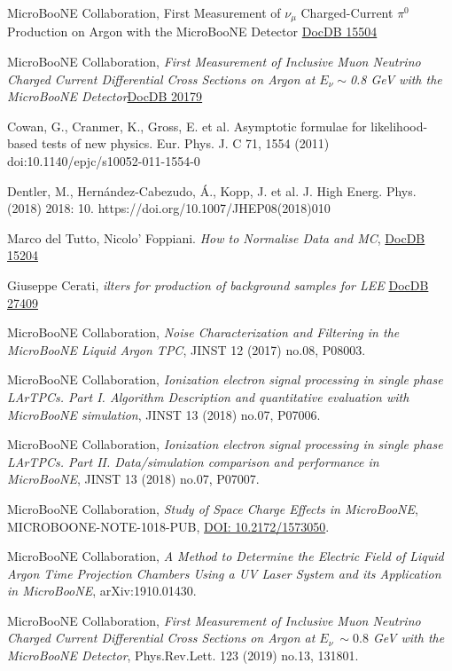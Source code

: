 \documentclass[a4paper]{article}
\begin{document}
\begin{thebibliography}{}
 MicroBooNE Collaboration, First Measurement of $\nu_\mu$ Charged-Current $\pi^0$ Production on Argon with the MicroBooNE Detector \href{https://microboone-docdb.fnal.gov/cgi-bin/private/RetrieveFile?docid=15504&filename=MicroBooNE_CCPizero_Run1_FinalVersion.pdf&version=17}{DocDB 15504}

 MicroBooNE Collaboration, \emph{First Measurement of Inclusive Muon Neutrino Charged Current Differential Cross Sections on Argon at $E_\nu \sim$0.8 GeV with the MicroBooNE Detector}\href{https://microboone-docdb.fnal.gov/cgi-bin/private/RetrieveFile?docid=20179&filename=ccinclusive_paper_prl_v4.9.pdf&version=19}{DocDB 20179}


Cowan, G., Cranmer, K., Gross, E. et al. Asymptotic formulae for likelihood-based tests of new physics. Eur. Phys. J. C 71, 1554 (2011) doi:10.1140/epjc/s10052-011-1554-0

Dentler, M., Hernández-Cabezudo, Á., Kopp, J. et al. J. High Energ. Phys. (2018) 2018: 10. https://doi.org/10.1007/JHEP08(2018)010

Marco del Tutto, Nicolo' Foppiani. \emph{How to Normalise Data and MC}, \href{https://microboone-docdb.fnal.gov/cgi-bin/private/ShowDocument?docid=15204}{DocDB 15204}

Giuseppe Cerati, \emph{ilters for production of background samples for LEE} \href{https://microboone-docdb.fnal.gov/cgi-bin/private/ShowDocument?docid=27409}{DocDB 27409}

MicroBooNE Collaboration, \emph{Noise Characterization and Filtering in the MicroBooNE Liquid Argon TPC}, JINST 12 (2017) no.08, P08003.

MicroBooNE Collaboration, \emph{Ionization electron signal processing in single phase LArTPCs. Part I. Algorithm Description and quantitative evaluation with MicroBooNE simulation}, JINST 13 (2018) no.07, P07006.


MicroBooNE Collaboration, \emph{Ionization electron signal processing in single phase LArTPCs. Part II. Data/simulation comparison and performance in MicroBooNE}, JINST 13 (2018) no.07, P07007.

MicroBooNE Collaboration, \emph{Study of Space Charge Effects in MicroBooNE}, MICROBOONE-NOTE-1018-PUB, \href{http://inspirehep.net/record/1763018}{DOI: 10.2172/1573050}.

MicroBooNE Collaboration, \emph{A Method to Determine the Electric Field of Liquid Argon Time Projection Chambers Using a UV Laser System and its Application in MicroBooNE},  arXiv:1910.01430.

MicroBooNE Collaboration, \emph{First Measurement of Inclusive Muon Neutrino Charged Current Differential Cross Sections on Argon at $E_\nu ~\sim0.8$ GeV with the MicroBooNE Detector}, Phys.Rev.Lett. 123 (2019) no.13, 131801.

\end{thebibliography}
\end{document}
